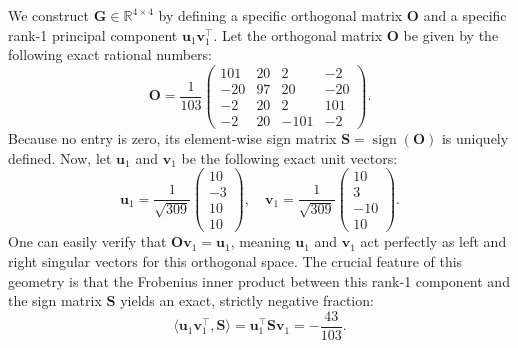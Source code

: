 \documentclass{article}
\begin{document}
We construct $\mathbf{G} \in \mathbb{R}^{4 \times 4}$ by defining a specific orthogonal matrix $\mathbf{O}$ and a specific rank-1 principal component $\mathbf{u}_1 \mathbf{v}_1^\top$. Let the orthogonal matrix $\mathbf{O}$ be given by the following exact rational numbers:
\begin{equation}
\mathbf{O} = \frac{1}{103} \begin{pmatrix} 101 & 20 & 2 & -2 \\ -20 & 97 & 20 & -20 \\ -2 & 20 & 2 & 101 \\ -2 & 20 & -101 & -2 \end{pmatrix}.
\end{equation}
Because no entry is zero, its element-wise sign matrix $\mathbf{S} = \operatorname{sign}(\mathbf{O})$ is uniquely defined. Now, let $\mathbf{u}_1$ and $\mathbf{v}_1$ be the following exact unit vectors:
\begin{equation}
\mathbf{u}_1 = \frac{1}{\sqrt{309}} \begin{pmatrix} 10 \\ -3 \\ 10 \\ 10 \end{pmatrix}, \quad \mathbf{v}_1 = \frac{1}{\sqrt{309}} \begin{pmatrix} 10 \\ 3 \\ -10 \\ 10 \end{pmatrix}.
\end{equation}
One can easily verify that $\mathbf{O} \mathbf{v}_1 = \mathbf{u}_1$, meaning $\mathbf{u}_1$ and $\mathbf{v}_1$ act perfectly as left and right singular vectors for this orthogonal space. The crucial feature of this geometry is that the Frobenius inner product between this rank-1 component and the sign matrix $\mathbf{S}$ yields an exact, strictly negative fraction:
\begin{equation}
\langle \mathbf{u}_1 \mathbf{v}_1^\top, \mathbf{S} \rangle = \mathbf{u}_1^\top \mathbf{S} \mathbf{v}_1 = -\frac{43}{103}.
\end{equation}
\end{document}
